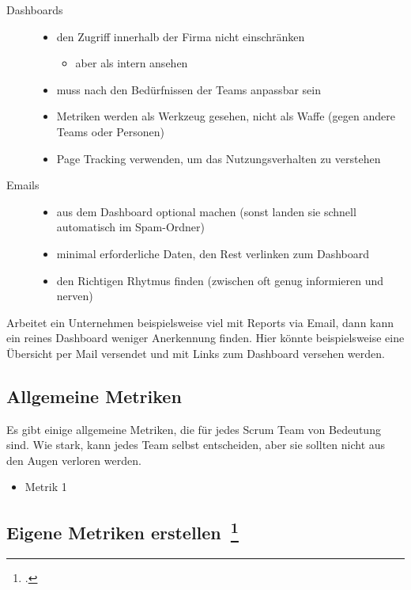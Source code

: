 \begin{description}
  \item[Dashboards] \hfill
  \begin{itemize}[noitemsep]
    \item den Zugriff innerhalb der Firma nicht einschränken
    \begin{itemize}[noitemsep]
      \item aber als intern ansehen
    \end{itemize}
    \item muss nach den Bedürfnissen der Teams anpassbar sein
    \item Metriken werden als Werkzeug gesehen, nicht als Waffe (gegen andere Teams oder Personen)
    \item Page Tracking verwenden, um das Nutzungsverhalten zu verstehen
  \end{itemize}
  \item[Emails] \hfill
  \begin{itemize}[noitemsep]
    \item aus dem Dashboard optional machen (sonst landen sie schnell automatisch im Spam-Ordner)
    \item minimal erforderliche Daten, den Rest verlinken zum Dashboard
    \item den Richtigen Rhytmus finden (zwischen oft genug informieren und nerven)
  \end{itemize}
\end{description}

Arbeitet ein Unternehmen beispielsweise viel mit Reports via Email, dann kann ein reines Dashboard weniger Anerkennung finden. Hier könnte beispielsweise eine Übersicht per Mail versendet und mit Links zum Dashboard versehen werden.

\subsection{Allgemeine Metriken}

Es gibt einige allgemeine Metriken, die für jedes Scrum Team von Bedeutung sind.
Wie stark, kann jedes Team selbst entscheiden, aber sie sollten nicht aus den Augen verloren werden.

\begin{itemize}[noitemsep]
  \item Metrik 1
\end{itemize}

\subsection[Eigene Metriken erstellen]{Eigene Metriken erstellen~\footcite[vgl.][S.127ff]{davis_agile_2015}}


